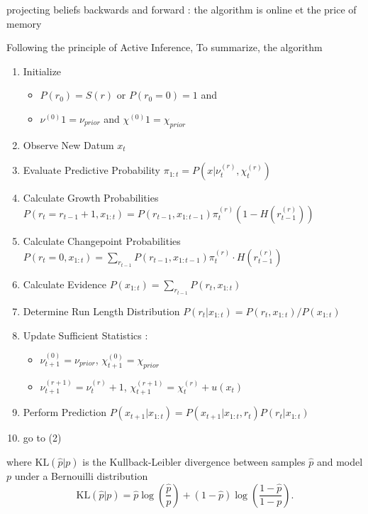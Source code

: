 \documentclass[profile,final,english, draft]{article}%
\newcommand{\KL}[2]{\text{KL}( #1 | #2 )}
\newcommand{\pa}[1]{\left( #1 \right)}
\begin{document}
projecting beliefs backwards and forward  : the algorithm is online et the price of memory

Following the principle of Active Inference,
To summarize, the algorithm %

\begin{enumerate}
	\item     Initialize

	\begin{itemize}
		\item    $P(r_0)= S(r)$ or $P(r_0=0)=1$ and
		\item    $\nu^{(0)}1 = \nu_{prior}$ and $\chi^{(0)}1 = \chi_{prior}$
	\end{itemize}

	\item    Observe New Datum $x_t$
    \item    Evaluate Predictive Probability $\pi_{1:t} = P(x |\nu^{(r)}_t,\chi^{(r)}_t)$
    \item    Calculate Growth Probabilities $P(r_t=r_{t-1}+1, x_{1:t}) = P(r_{t-1}, x_{1:t-1}) \pi^{(r)}_t (1-H(r^{(r)}_{t-1}))$
    \item    Calculate Changepoint Probabilities $P(r_t=0, x_{1:t})= \sum_{r_{t-1}} P(r_{t-1}, x_{1:t-1}) \pi^{(r)}_t \cdot H(r^{(r)}_{t-1})$
    \item    Calculate Evidence $P(x_{1:t}) = \sum_{r_{t-1}} P (r_t, x_{1:t})$
    \item    Determine Run Length Distribution $P (r_t | x_{1:t}) = P (r_t, x_{1:t})/P (x_{1:t}) $
    \item    Update Sufficient Statistics :
	\begin{itemize}
		\item    $\nu^{(0)}_{t+1} = \nu_{prior}$, $\chi^{(0)}_{t+1} = \chi_{prior}$
		\item    $\nu^{(r+1)}_{t+1} = \nu^{(r)}_{t} +1$, $\chi^{(r+1)}_{t+1} = \chi^{(r)}_{t} + u(x_t)$
	\end{itemize}

    \item    Perform Prediction $P (x_{t+1} | x_{1:t}) = P (x_{t+1}|x_{1:t} , r_t) P (r_t|x_{1:t})$
    \item    go to (2)
\end{enumerate}

where $\KL{\hat p}{p}$ is the Kullback-Leibler divergence between samples $\hat p$ and model $p$ under a Bernouilli distribution
\begin{equation}
\KL{\hat p}{p} = \hat{p} \log\pa{\frac{\hat p}{p}} + (1-\hat p) \log\pa{\frac{1-\hat p}{1-p}}.
\end{equation}
\end{document}
